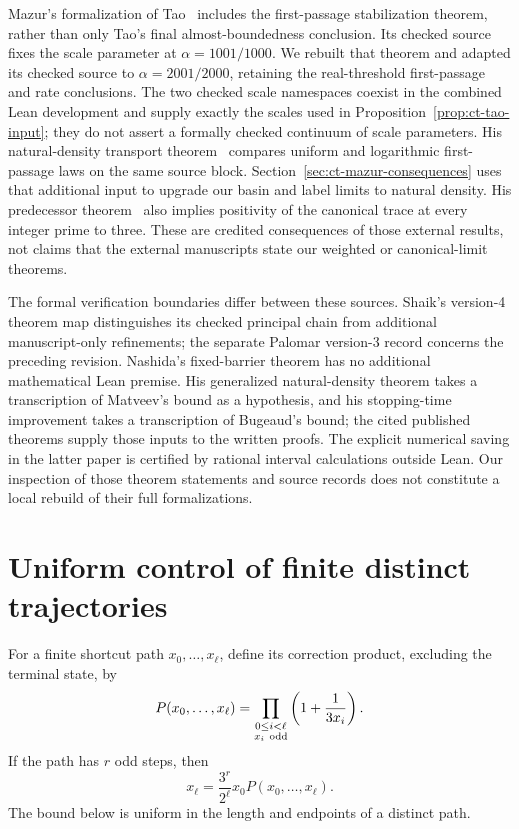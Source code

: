 \documentclass[11pt,a4paper]{article}
\begin{document}
Mazur's formalization of Tao~\cite{MazurTao2026} includes the
first-passage stabilization theorem, rather than only Tao's final
almost-boundedness conclusion. Its checked source fixes the scale
parameter at \(\alpha=1001/1000\). We rebuilt that theorem and
adapted its checked source to \(\alpha=2001/2000\), retaining the
real-threshold first-passage and rate conclusions. The two checked scale namespaces coexist in the combined Lean
development and supply exactly the scales used in
Proposition~\ref{prop:ct-tao-input}; they do not assert a formally
checked continuum of scale parameters.
His natural-density transport theorem~\cite{MazurNatural2026}
compares uniform and logarithmic first-passage laws on the same
source block. Section~\ref{sec:ct-mazur-consequences} uses that
additional input to upgrade our basin and label limits to natural
density. His predecessor theorem~\cite{MazurPredecessors2026}
also implies positivity of the canonical trace at every integer
prime to three. These are credited consequences of those external
results, not claims that the external manuscripts state our
weighted or canonical-limit theorems.

The formal verification boundaries differ between these sources.
Shaik's version-4 theorem map distinguishes its checked principal
chain from additional manuscript-only refinements; the separate
Palomar version-3 record concerns the preceding revision.
Nashida's fixed-barrier theorem has no additional mathematical
Lean premise. His generalized natural-density theorem takes a
transcription of Matveev's bound as a hypothesis, and his
stopping-time improvement takes a transcription of Bugeaud's
bound; the cited published theorems supply those inputs to the
written proofs. The explicit numerical saving in the latter
paper is certified by rational interval calculations outside Lean.
Our inspection of those theorem statements and source records
does not constitute a local rebuild of their full formalizations.

\section{Uniform control of finite distinct trajectories}

For a finite shortcut path \(x_0,\ldots,x_\ell\), define its
correction product, excluding the terminal state, by
\[
 P(x_0,\ldots,x_\ell)
 =\prod_{\substack{0\le i<\ell\\x_i\ {\rm odd}}}
       \left(1+\frac1{3x_i}\right).
\]
If the path has \(r\) odd steps, then
\begin{equation}\label{eq:ct-product}
 x_\ell=\frac{3^r}{2^\ell}x_0P(x_0,\ldots,x_\ell).
\end{equation}
The bound below is uniform in the length and endpoints of a
distinct path.
\end{document}
